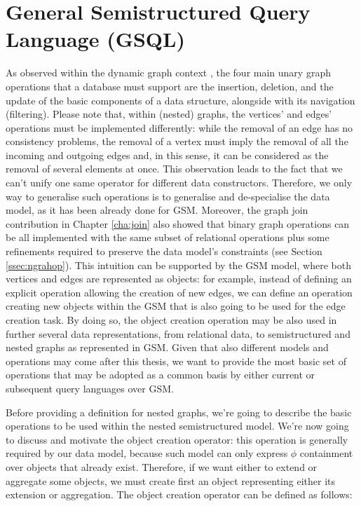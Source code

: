 \section{General Semistructured Query Language (GSQL)}\label{sec:gsqldef}
As  observed within the dynamic graph context \cite{Demetrescu2010}, the four main unary graph operations that a database must support are the insertion,  deletion, and the update of the basic components of a data structure, alongside with its navigation (filtering). Please note that, within  (nested) graphs, the vertices' and edges' operations must be implemented differently: while the removal of an edge has no consistency problems, the removal of a vertex must imply the removal of all the incoming and outgoing edges and, in this sense, it can be considered as the removal of several elements at once. This observation leads to the fact that we can't unify one same operator for different data constructors. Therefore, we only way to generalise such operations is to generalise and de-specialise the data model, as it has been already done for GSM. Moreover, the graph join contribution in Chapter \ref{cha:join} also showed that binary graph operations can be all implemented with the same subset of relational operations plus some refinements required to preserve the data model's constraints (see Section \vref{ssec:ngrahop}). This intuition can be supported by the GSM model, where both vertices and edges are represented as objects: %
for example, instead of defining an explicit operation allowing the creation of new edges, we can  define an operation creating new objects within the GSM that is also going to be used for the edge creation task. By doing so, the object creation operation may be also used in further several data representations, from relational data, to semistructured and nested graphs as represented in GSM. Given that also different models and operations may come after this thesis, we want to provide the most basic set of operations that may be adopted  as a common basis by either current or subsequent query languages over GSM. 

Before providing a definition for nested graphs, we're going to describe the basic operations to be used within the nested semistructured model. We're now going to discuss and motivate the object creation operator: this operation is generally required by our data model, because such model can only express $\phi$ containment over objects that already exist. Therefore, if we want either to extend  or aggregate some objects, we must create first an object representing either its extension or  aggregation. The object creation operator can be defined as follows:

